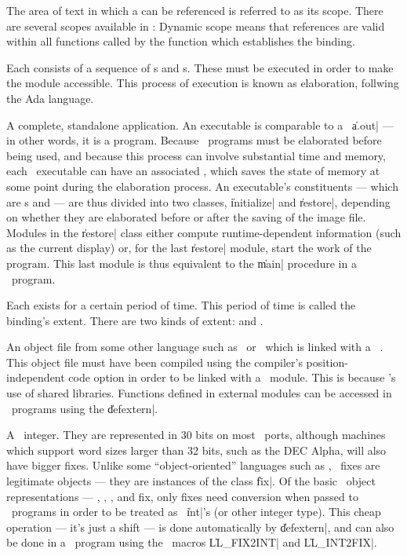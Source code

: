 \begin{description}
	{The area of text in which a  can be referenced
	is referred to as its scope.  There are several scopes
	available in \Talk:  Dynamic scope means that references are
	valid within all functions called by the function which
	establishes the binding.}

	{Each  consists of a sequence of
	s and s.  These must be
	executed in order to make the module accessible.  This
	process of execution is known as elaboration, follwing the
	{\sc Ada} language.}

	{A complete, standalone application.  An executable is
	comparable to a \langc\ \|a.out| --- in other words, it is a
	program.  Because \Talk\ programs must be elaborated before
	being used, and because this process can involve substantial
	time and memory, each \Talk\ executable can have an associated
	, which saves the state of memory at some point
	during the elaboration process.  An executable's constituents
	--- which are s and  --- are thus
	divided into two classes, \|initialize| and \|restore|,
	depending on whether they are elaborated before or after the
	saving of the image file.  Modules in the \|restore| class
	either compute runtime-dependent information (such as the
	current display) or, for the last \|restore| module, start the
	work of the program.  This last module is thus equivalent to
	the \|main| procedure in a \langc\ program.}

	{Each  exists for a certain period of time.
	This period of time is called the binding's extent.  There are
	two kinds of extent:  and
	.}

	{An object file from some other language such as \langc\ or
	\fortran\ which is linked with a \Talk\ .  This
	object file must have been compiled using the compiler's
	position-independent code option in order to be linked with a
	\Talk\ module.  This is because \Talk's use of shared
	libraries.  Functions defined in external modules can be
	accessed in \Talk\ programs using the 
	\|defextern|.}

	{A \Talk\ integer.  They are represented in 30 bits on most
	\Talk\ ports, although machines which support word sizes
	larger than 32 bits, such as the {\sc DEC Alpha}, will also
	have bigger fixes.  Unlike some ``object-oriented'' languages
	such as \Cpp, \Talk\ fixes are legitimate objects --- they are
	instances of the class \|fix|.  Of the basic \Talk\ object
	representations --- , ,
	, and fix, only fixes need conversion when
	passed to \langc\ programs in order to be treated as \langc\
	\|int|'s (or other integer type).  This cheap operation ---
	it's just a shift --- is done automatically by \|defextern|,
	and can also be done in a \langc\ program using the \langc\
	macros \|LL\_FIX2INT| and \|LL\_INT2FIX|.}


\end{description}
